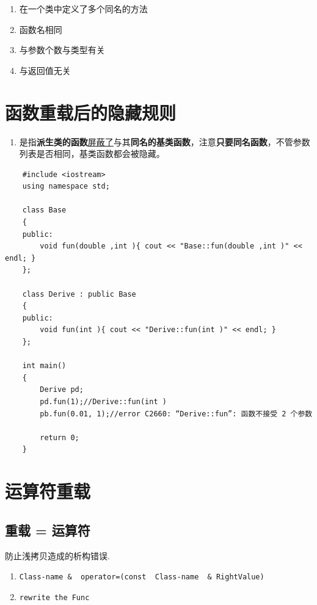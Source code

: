 \documentclass[UTF8,a4paper,12pt]{ctexbook} %
\begin{document}
       \begin{enumerate}[fullwidth,itemindent=2em]
       	\item  在一个类中定义了多个同名的方法
       	\item  函数名相同
       	\item  与参数个数与类型有关
       	\item  与返回值无关
       \end{enumerate}
       
    \section{函数重载后的隐藏规则}
	    
	    \begin{enumerate}
	    	\item 是指\textbf{派生类的函数}\underline{屏蔽了}与其\textbf{同名的基类函数}，注意\textbf{只要同名函数}，不管参数列表是否相同，基类函数都会被隐藏。
	    \end{enumerate}   
        
        \begin{lstlisting}
	#include <iostream>
	using namespace std;
	
	class Base
	{
	public:
		void fun(double ,int ){ cout << "Base::fun(double ,int )" << endl; }
	};
	
	class Derive : public Base
	{
	public:
		void fun(int ){ cout << "Derive::fun(int )" << endl; }
	};
	
	int main()
	{
		Derive pd;
		pd.fun(1);//Derive::fun(int )
		pb.fun(0.01, 1);//error C2660: “Derive::fun”: 函数不接受 2 个参数

		return 0;
	}
        \end{lstlisting}
     \section{运算符重载}
        
	        \subsection{重载 = 运算符}
		        防止浅拷贝造成的析构错误.
	        
		        \begin{enumerate}[fullwidth,itemindent=2em]
		        	\item  \verb|Class-name &  operator=(const  Class-name  & RightValue)|
		        	\item  \verb|rewrite the Func|
		        \end{enumerate}
	        
\end{document}
